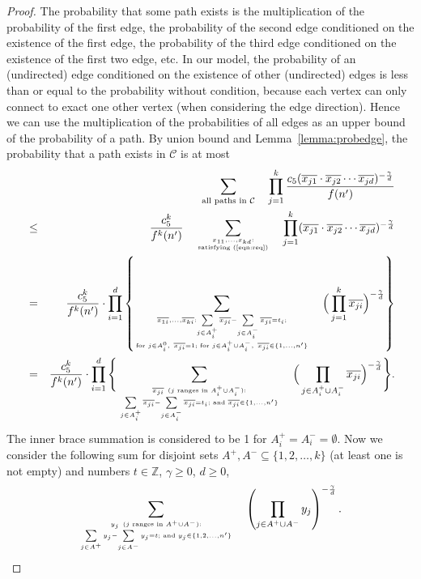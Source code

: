 \documentclass[11pt]{article}
\begin{document}
\begin{proof}
The probability that some path exists is the multiplication of the probability of the first edge, the probability of the second edge conditioned on the existence of the first edge, the probability of the third edge conditioned on the existence of the first two edge, etc. In our model, the probability of an (undirected) edge conditioned on the existence of other (undirected) edges is less than or equal to the probability without condition, because each vertex can only 
	connect to exact one other vertex (when considering the edge direction).
Hence we can use the multiplication of the probabilities of all edges as an upper bound of the probability of a path. By union bound and Lemma~\ref{lemma:probedge}, the probability that a path exists in $\mathcal{C}$ is at most
\begin{eqnarray}
& & \sum_{\textrm{all paths in }\mathcal{C}}\quad\prod_{j=1}^k\frac{c_5(\overline{x_{j1}}\cdot\overline{x_{j2}}\cdots\overline{x_{jd}})^{-\frac{\gamma}{d}}}{f(n')} \nonumber \\
& \leq & \frac{c_5^k}{f^k(n')}\quad\sum_{x_{11},\ldots,x_{kd}:\atop \text{satisfying (\ref{eqn:req})}}\quad\prod_{j=1}^k(\overline{x_{j1}}\cdot\overline{x_{j2}}\cdots\overline{x_{jd}})^{-\frac{\gamma}{d}} \nonumber \\
& = & \frac{c_5^k}{f^k(n')}\cdot\prod_{i=1}^d\left\{\sum_{\overline{x_{1i}},\ldots,\overline{x_{ki}}: \sum\limits_{j\in A_i^+}\overline{x_{ji}}-\sum\limits_{j\in A_i^-}\overline{x_{ji}}=t_i; \atop \text{for }j\in A_i^0,\ \overline{x_{ji}}=1\text{; for }j\in A_i^+\cup A_i^-,\ \overline{x_{ji}}\in\{1,\ldots,n'\}}\quad\Big(\prod_{j=1}^k\overline{x_{ji}}\Big)^{-\frac{\gamma}{d}}\right\} \nonumber \\
& = & \frac{c_5^k}{f^k(n')}\cdot\prod_{i=1}^d\Bigg\{\sum_{\overline{x_{ji}}\ (j\text{ ranges in }A_i^+\cup A_i^-): \atop\sum\limits_{j\in A_i^+}\overline{x_{ji}}-\sum\limits_{j\in A_i^-}\overline{x_{ji}}=t_i\text{; and }\overline{x_{ji}}\in\{1,\ldots,n'\}}\quad\Big(\prod_{j\in A_i^+\cup A_i^-}\overline{x_{ji}}\Big)^{-\frac{\gamma}{d}}\Bigg\}. \label{eqn:probc}
\end{eqnarray}
The inner brace summation is considered to be 1 for $A_i^+=A_i^-=\emptyset$. Now we consider the following sum for disjoint sets $A^+,A^-\subseteq\{1,2,\ldots,k\}$ (at least one is not empty) and numbers $t\in\mathbb{Z}$, $\gamma\geq0$, $d\geq0$,
\begin{equation} \label{eqn:sum}
\sum_{y_j\ (j\text{ ranges in }A^+\cup A^-): \atop \sum\limits_{j\in A^+}y_j-\sum\limits_{j\in A^-}y_j=t\text{; and }y_j\in\{1,2,\ldots,n'\}}\quad\left(\prod\limits_{j\in A^+\cup A^-}y_j\right)^{-\frac{\gamma}{d}}.
\end{equation}


\end{proof}
\end{document}

